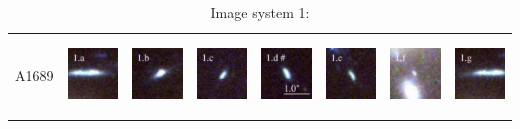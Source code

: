 \documentclass[useAMS,usenatbib]{mn2e}
\begin{document}
\begin{table}
  \caption{Image system 1:}\vspace{0mm}
  \begin{tabular}{cccccccc}
    \multicolumn{1}{m{1cm}}{{\Large A1689}}
    & \multicolumn{1}{m{1.7cm}}{\includegraphics[height=2.00cm,clip]{figs/nsie_img/rgb.img_1_a.ps}}
    & \multicolumn{1}{m{1.7cm}}{\includegraphics[height=2.00cm,clip]{figs/nsie_img/rgb.img_1_b.ps}}
    & \multicolumn{1}{m{1.7cm}}{\includegraphics[height=2.00cm,clip]{figs/nsie_img/rgb.img_1_c.ps}}
    & \multicolumn{1}{m{1.7cm}}{\includegraphics[height=2.00cm,clip]{figs/nsie_img/rgb.img_1_d.ps}}
    & \multicolumn{1}{m{1.7cm}}{\includegraphics[height=2.00cm,clip]{figs/nsie_img/rgb.img_1_e.ps}}
    & \multicolumn{1}{m{1.7cm}}{\includegraphics[height=2.00cm,clip]{figs/nsie_img/rgb.img_1_f.ps}}
    & \multicolumn{1}{m{1.7cm}}{\includegraphics[height=2.00cm,clip]{figs/nsie_img/rgb.img_1_g.ps}} \\

\end{tabular}
\end{table}
\end{document}

